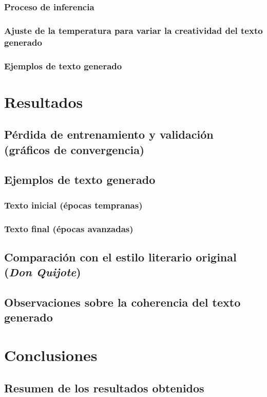 \documentclass{article}
\begin{document}
\subsubsection{Proceso de inferencia}
\subsubsection{Ajuste de la temperatura para variar la creatividad del texto generado}
\subsubsection{Ejemplos de texto generado}

\section{Resultados}
\subsection{Pérdida de entrenamiento y validación (gráficos de convergencia)}
\subsection{Ejemplos de texto generado}
\subsubsection{Texto inicial (épocas tempranas)}
\subsubsection{Texto final (épocas avanzadas)}
\subsection{Comparación con el estilo literario original (\textit{Don Quijote})}
\subsection{Observaciones sobre la coherencia del texto generado}

\newpage

\section{Conclusiones}
\subsection{Resumen de los resultados obtenidos}
\end{document}
